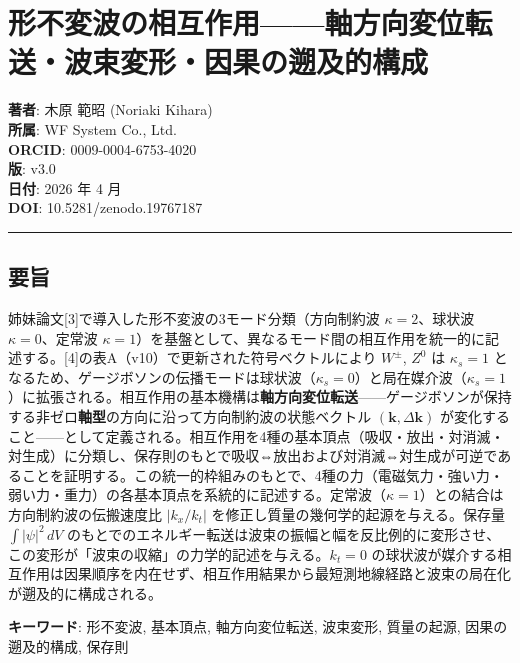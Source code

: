 \documentclass[
  a4paper,11pt]{ltjsarticle}
\theoremstyle{definition}
\theoremstyle{remark}
\begin{document}
\section{形不変波の相互作用------軸方向変位転送・波束変形・因果の遡及的構成}\label{ux5f62ux4e0dux5909ux6ce2ux306eux76f8ux4e92ux4f5cux7528ux8ef8ux65b9ux5411ux5909ux4f4dux8ee2ux9001ux6ce2ux675fux5909ux5f62ux56e0ux679cux306eux9061ux53caux7684ux69cbux6210}

\textbf{著者}: 木原 範昭 (Noriaki Kihara)\\
\textbf{所属}: WF System Co., Ltd.\\
\textbf{ORCID}: 0009-0004-6753-4020\\
\textbf{版}: v3.0\\
\textbf{日付}: 2026 年 4 月\\
\textbf{DOI}: 10.5281/zenodo.19767187

\begin{center}\rule{0.5\linewidth}{0.5pt}\end{center}

\subsection{要旨}\label{ux8981ux65e8}

姉妹論文{[}3{]}で導入した形不変波の3モード分類（方向制約波
\(\kappa = 2\)、球状波 \(\kappa = 0\)、定常波
\(\kappa = 1\)）を基盤として、異なるモード間の相互作用を統一的に記述する。{[}4{]}の表A（v10）で更新された符号ベクトルにより
\(W^{\pm}\), \(Z^0\) は \(\kappa_s = 1\)
となるため、ゲージボソンの伝播モードは球状波（\(\kappa_s = 0\)）と局在媒介波（\(\kappa_s = 1\)）に拡張される。相互作用の基本機構は\textbf{軸方向変位転送}------ゲージボソンが保持する非ゼロ\textbf{軸型}の方向に沿って方向制約波の状態ベクトル
\((\mathbf{k}, \Delta\mathbf{k})\)
が変化すること------として定義される。相互作用を4種の基本頂点（吸収・放出・対消滅・対生成）に分類し、保存則のもとで吸収⇔放出および対消滅⇔対生成が可逆であることを証明する。この統一的枠組みのもとで、4種の力（電磁気力・強い力・弱い力・重力）の各基本頂点を系統的に記述する。定常波（\(\kappa = 1\)）との結合は方向制約波の伝搬速度比
\(|k_x / k_t|\) を修正し質量の幾何学的起源を与える。保存量
\(\int |\psi|^2 \, dV\)
のもとでのエネルギー転送は波束の振幅と幅を反比例的に変形させ、この変形が「波束の収縮」の力学的記述を与える。\(k_t = 0\)
の球状波が媒介する相互作用は因果順序を内在せず、相互作用結果から最短測地線経路と波束の局在化が遡及的に構成される。

\textbf{キーワード}: 形不変波, 基本頂点, 軸方向変位転送, 波束変形,
質量の起源, 因果の遡及的構成, 保存則
\end{document}
